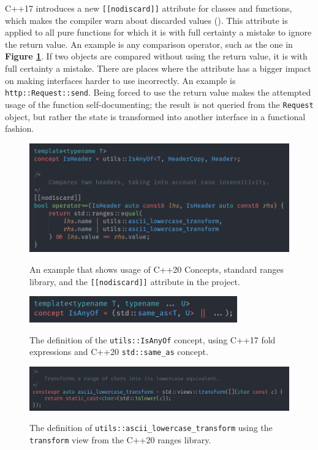 \documentclass[12pt, a4paper]{article}
\begin{document}
C++17 introduces a new \texttt{[[nodiscard]]} attribute for classes and functions, which makes the compiler warn about discarded values (\cite{CppNodiscard}). This attribute is applied to all pure functions for which it is with full certainty a mistake to ignore the return value. An example is any comparison operator, such as the one in \textbf{Figure \ref{fig:constraints_example}}. If two objects are compared without using the return value, it is with full certainty a mistake. There are places where the attribute has a bigger impact on making interfaces harder to use incorrectly. An example is \texttt{http::Request::send}. Being forced to use the return value makes the attempted usage of the function self-documenting; the result is not queried from the \texttt{Request} object, but rather the state is transformed into another interface in a functional fashion.

\begin{figure}[hp]
	\centering
	\caption{An example that shows usage of C++20 Concepts, standard ranges library, and the \texttt{[[nodiscard]]} attribute in the project.}
	\includegraphics[width=\textwidth]{constraints_example}
	\label{fig:constraints_example}
\end{figure}

\begin{figure}[hp]
	\centering
	\caption{The definition of the \texttt{utils::IsAnyOf} concept, using C++17 fold expressions and C++20 \texttt{std::same\_as} concept.}
	\includegraphics[width=0.8\textwidth]{is_any_of_concept}
	\label{fig:is_any_of_concept}
\end{figure}

\begin{figure}[hp]
	\centering
	\caption{The definition of \texttt{utils::ascii\_lowercase\_transform} using the \texttt{transform} view from the C++20 ranges library.}
	\includegraphics[width=\textwidth]{lowercase_transform_definition}
	\label{fig:lowercase_transform_definition}
\end{figure}
\end{document}
